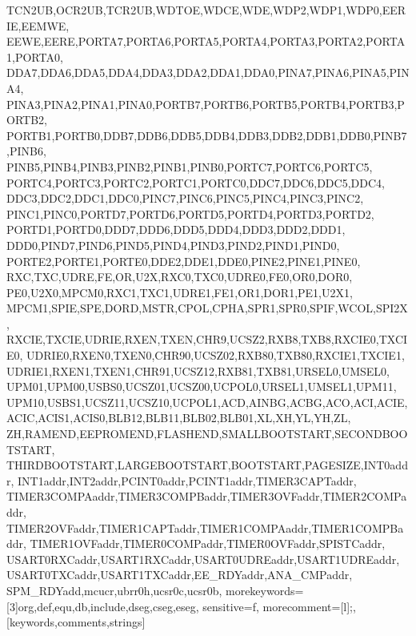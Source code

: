 {{                TCN2UB,OCR2UB,TCR2UB,WDTOE,WDCE,WDE,WDP2,WDP1,WDP0,EERIE,EEMWE,
                EEWE,EERE,PORTA7,PORTA6,PORTA5,PORTA4,PORTA3,PORTA2,PORTA1,PORTA0,
                DDA7,DDA6,DDA5,DDA4,DDA3,DDA2,DDA1,DDA0,PINA7,PINA6,PINA5,PINA4,
                PINA3,PINA2,PINA1,PINA0,PORTB7,PORTB6,PORTB5,PORTB4,PORTB3,PORTB2,
                PORTB1,PORTB0,DDB7,DDB6,DDB5,DDB4,DDB3,DDB2,DDB1,DDB0,PINB7,PINB6,
                PINB5,PINB4,PINB3,PINB2,PINB1,PINB0,PORTC7,PORTC6,PORTC5,
                PORTC4,PORTC3,PORTC2,PORTC1,PORTC0,DDC7,DDC6,DDC5,DDC4,
                DDC3,DDC2,DDC1,DDC0,PINC7,PINC6,PINC5,PINC4,PINC3,PINC2,
                PINC1,PINC0,PORTD7,PORTD6,PORTD5,PORTD4,PORTD3,PORTD2,
                PORTD1,PORTD0,DDD7,DDD6,DDD5,DDD4,DDD3,DDD2,DDD1,
                DDD0,PIND7,PIND6,PIND5,PIND4,PIND3,PIND2,PIND1,PIND0,
                PORTE2,PORTE1,PORTE0,DDE2,DDE1,DDE0,PINE2,PINE1,PINE0,
                RXC,TXC,UDRE,FE,OR,U2X,RXC0,TXC0,UDRE0,FE0,OR0,DOR0,
                PE0,U2X0,MPCM0,RXC1,TXC1,UDRE1,FE1,OR1,DOR1,PE1,U2X1,
                MPCM1,SPIE,SPE,DORD,MSTR,CPOL,CPHA,SPR1,SPR0,SPIF,WCOL,SPI2X,
                RXCIE,TXCIE,UDRIE,RXEN,TXEN,CHR9,UCSZ2,RXB8,TXB8,RXCIE0,TXCIE0,
                UDRIE0,RXEN0,TXEN0,CHR90,UCSZ02,RXB80,TXB80,RXCIE1,TXCIE1,
                UDRIE1,RXEN1,TXEN1,CHR91,UCSZ12,RXB81,TXB81,URSEL0,UMSEL0,
                UPM01,UPM00,USBS0,UCSZ01,UCSZ00,UCPOL0,URSEL1,UMSEL1,UPM11,
                UPM10,USBS1,UCSZ11,UCSZ10,UCPOL1,ACD,AINBG,ACBG,ACO,ACI,ACIE,
                ACIC,ACIS1,ACIS0,BLB12,BLB11,BLB02,BLB01,XL,XH,YL,YH,ZL,
                ZH,RAMEND,EEPROMEND,FLASHEND,SMALLBOOTSTART,SECONDBOOTSTART,
                THIRDBOOTSTART,LARGEBOOTSTART,BOOTSTART,PAGESIZE,INT0addr,
                INT1addr,INT2addr,PCINT0addr,PCINT1addr,TIMER3CAPTaddr,
                TIMER3COMPAaddr,TIMER3COMPBaddr,TIMER3OVFaddr,TIMER2COMPaddr,
                TIMER2OVFaddr,TIMER1CAPTaddr,TIMER1COMPAaddr,TIMER1COMPBaddr,
                TIMER1OVFaddr,TIMER0COMPaddr,TIMER0OVFaddr,SPISTCaddr,
                USART0RXCaddr,USART1RXCaddr,USART0UDREaddr,USART1UDREaddr,
                USART0TXCaddr,USART1TXCaddr,EE_RDYaddr,ANA_CMPaddr,
                SPM_RDYadd,mcucr,ubrr0h,ucsr0c,ucsr0b},%
morekeywords=[3]{org,def,equ,db,include,dseg,cseg,eseg},%
sensitive=f,%
morecomment=[l];,%
}[keywords,comments,strings]%


